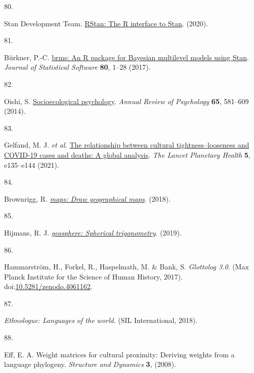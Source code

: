\documentclass[
  man,floatsintext]{apa6}
\newlength{\cslhangindent}
\newlength{\csllabelwidth}
\newlength{\cslentryspacingunit} %
\newenvironment{CSLReferences}[2] %
 {%
  \setlength{\parindent}{0pt}
  \ifodd #1
  \let\oldpar\par
  \def\par{\hangindent=\cslhangindent\oldpar}
  \fi
  \setlength{\parskip}{#2\cslentryspacingunit}
 }%
 {}
\newcommand{\CSLLeftMargin}[1]{\parbox[t]{\csllabelwidth}{#1}}
\newcommand{\CSLRightInline}[1]{\parbox[t]{\linewidth - \csllabelwidth}{#1}\break}
\begin{document}
\begin{CSLReferences}{0}{0}
\leavevmode{}%
\CSLLeftMargin{80. }%
\CSLRightInline{Stan Development Team. \href{http://mc-stan.org/}{{RStan}: The {R} interface to {Stan}}. (2020).}

\leavevmode{}%
\CSLLeftMargin{81. }%
\CSLRightInline{Bürkner, P.-C. \href{https://doi.org/10.18637/jss.v080.i01}{{brms}: An {R} package for {Bayesian} multilevel models using {Stan}}. \emph{Journal of Statistical Software} \textbf{80}, 1--28 (2017).}

\leavevmode{}%
\CSLLeftMargin{82. }%
\CSLRightInline{Oishi, S. \href{https://doi.org/10.1146/annurev-psych-030413-152156}{Socioecological psychology}. \emph{Annual Review of Psychology} \textbf{65}, 581--609 (2014).}

\leavevmode{}%
\CSLLeftMargin{83. }%
\CSLRightInline{Gelfand, M. J. \emph{et al.} \href{https://doi.org/10.1016/S2542-5196(20)30301-6}{The relationship between cultural tightness--looseness and {COVID-19} cases and deaths: A global analysis}. \emph{The Lancet Planetary Health} \textbf{5}, e135--e144 (2021).}

\leavevmode{}%
\CSLLeftMargin{84. }%
\CSLRightInline{Brownrigg, R. \emph{\href{https://CRAN.R-project.org/package=maps}{{maps}: Draw geographical maps}}. (2018).}

\leavevmode{}%
\CSLLeftMargin{85. }%
\CSLRightInline{Hijmans, R. J. \emph{\href{https://CRAN.R-project.org/package=geosphere}{{geosphere}: Spherical trigonometry}}. (2019).}

\leavevmode{}%
\CSLLeftMargin{86. }%
\CSLRightInline{Hammarström, H., Forkel, R., Haspelmath, M. \& Bank, S. \emph{Glottolog 3.0}. (Max Planck Institute for the Science of Human History, 2017). doi:\href{https://doi.org/10.5281/zenodo.4061162}{10.5281/zenodo.4061162}.}

\leavevmode{}%
\CSLLeftMargin{87. }%
\CSLRightInline{\emph{Ethnologue: Languages of the world}. (SIL International, 2018).}

\leavevmode{}%
\CSLLeftMargin{88. }%
\CSLRightInline{Eff, E. A. Weight matrices for cultural proximity: Deriving weights from a language phylogeny. \emph{Structure and Dynamics} \textbf{3}, (2008).}


\end{CSLReferences}
\end{document}

